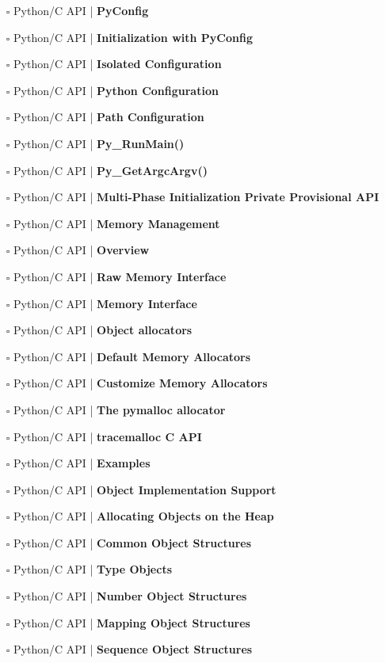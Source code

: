 \documentclass[a4, landscape, 12pt]{article}
\newcommand{\checkbox}{$\square$}%
\begin{document}
\begin{itemize}
{}
\item [\checkbox]  Python/C API | \textbf{ PyConfig
}
\item [\checkbox]  Python/C API | \textbf{ Initialization with PyConfig
}
\item [\checkbox]  Python/C API | \textbf{ Isolated Configuration
}
\item [\checkbox]  Python/C API | \textbf{ Python Configuration
}
\item [\checkbox]  Python/C API | \textbf{ Path Configuration
}
\item [\checkbox]  Python/C API | \textbf{ Py_RunMain()
}
\item [\checkbox]  Python/C API | \textbf{ Py_GetArgcArgv()
}
\item [\checkbox]  Python/C API | \textbf{ Multi-Phase Initialization Private Provisional API
}
\item [\checkbox]  Python/C API | \textbf{ Memory Management
}
\item [\checkbox]  Python/C API | \textbf{ Overview
}
\item [\checkbox]  Python/C API | \textbf{ Raw Memory Interface
}
\item [\checkbox]  Python/C API | \textbf{ Memory Interface
}
\item [\checkbox]  Python/C API | \textbf{ Object allocators
}
\item [\checkbox]  Python/C API | \textbf{ Default Memory Allocators
}
\item [\checkbox]  Python/C API | \textbf{ Customize Memory Allocators
}
\item [\checkbox]  Python/C API | \textbf{ The pymalloc allocator
}
\item [\checkbox]  Python/C API | \textbf{ tracemalloc C API
}
\item [\checkbox]  Python/C API | \textbf{ Examples
}
\item [\checkbox]  Python/C API | \textbf{ Object Implementation Support
}
\item [\checkbox]  Python/C API | \textbf{ Allocating Objects on the Heap
}
\item [\checkbox]  Python/C API | \textbf{ Common Object Structures
}
\item [\checkbox]  Python/C API | \textbf{ Type Objects
}
\item [\checkbox]  Python/C API | \textbf{ Number Object Structures
}
\item [\checkbox]  Python/C API | \textbf{ Mapping Object Structures
}
\item [\checkbox]  Python/C API | \textbf{ Sequence Object Structures
}
\end{itemize}
\end{document}
